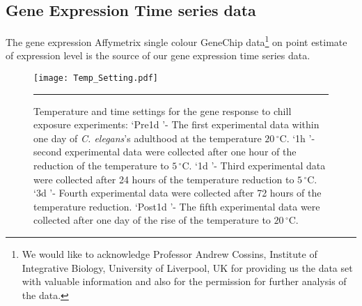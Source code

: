 \subsection{Gene Expression Time series data}\label{sec:Cele_gene_exp_data}
The gene expression Affymetrix single colour GeneChip data\footnote{We would like to acknowledge Professor Andrew Cossins, Institute of Integrative Biology, University of Liverpool, UK for providing us the data set with valuable information and also for the permission for further analysis of the data.} on point estimate of expression level is the source of our gene expression time series data.
\begin{figure}
	\centering
		\texttt{[image: Temp\_Setting.pdf]}
		\rule{35em}{0.5pt}
	\caption[Temperature and time settings for the gene response to chill exposure experiments]
		{Temperature and time settings for the gene response to chill exposure experiments:  \lq Pre1d \rq- The first experimental data within one day of \textit{C. elegans}'s adulthood at the temperature $20\,^{\circ}\mathrm{C}$. \lq 1h \rq- second experimental data were collected after one hour of the reduction of the temperature to $5\,^{\circ}\mathrm{C}$. \lq 1d \rq- Third experimental data were collected after 24 hours of the temperature reduction to $5\,^{\circ}\mathrm{C}$. \lq 3d \rq- Fourth experimental data were collected after 72 hours of the temperature reduction. \lq Post1d \rq- The fifth experimental data were collected after one day of the rise of the temperature to $20\,^{\circ}\mathrm{C}$.}
	\label{fig:Temp_Settings}
\end{figure}
